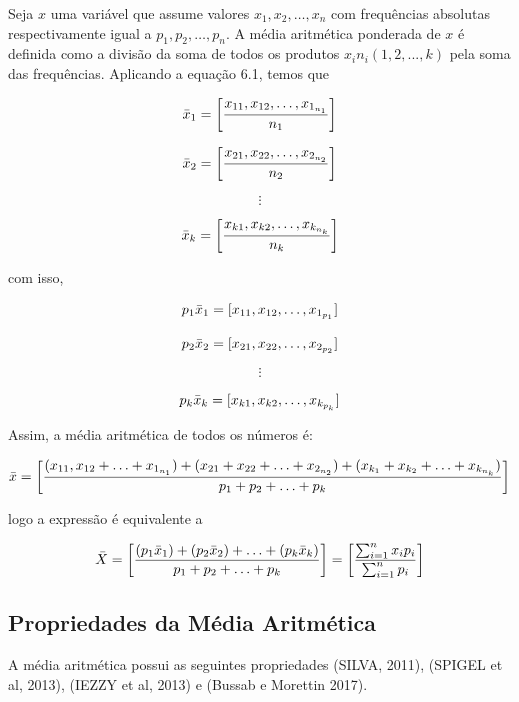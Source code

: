 Seja $x$ uma variável que assume valores $x_{1},x_{2},\ldots,x_{n}$ com frequências absolutas respectivamente igual a $p_{1},p_{2},\ldots,p_{n}$. A média aritmética ponderada de $x$ é  definida como a divisão da soma de todos os produtos $x_{i} n_{i}(1,2,...,k)$ pela soma das frequências. Aplicando a equação 6.1, temos que


$$
\Bar{x}_{1}=  \left[ \frac{x_{11},x_{12},\ldots, x_{1_{n_{1}}}}{n_{1}} \right ]
$$

$$
\Bar{x}_{2} =  \left[ \frac{x_{21},x_{22},\ldots, x_{2_{n_{2}}}}{n_{2}} \right ]
$$

$$
\vdots
$$

$$
\Bar{x}_{k} = \left[ \frac{x_{k1},x_{k2},\ldots, x_{k_{n_{k}}}}{n_{k}}  \right ]
$$

com isso, 

$$
p_{1}\Bar{x}_{1} = [x_{11},x_{12},\ldots, x_{1_{p_{1}}}]
$$

$$
p_{2}\Bar{x}_{2} = [x_{21},x_{22},\ldots, x_{2_{p_{2}}}]
$$

$$
\vdots
$$

$$
p_{k}\Bar{x}_{k} = [x_{k1},x_{k2},\ldots, x_{k_{p_{k}}}]
$$

Assim, a média aritmética de todos os números é:

$$
\Bar{x} = \left[ \frac{(x_{11},x_{12}+\ldots+x_{1_{n_{1}}})+(x_{21}+x_{22}+\ldots+x_{2_{n_{2}}})+(x_{k_{1}}+x_{k_{2}}+\ldots+x_{k_{n_{k}}})}{p_{1}+p_{2}+\ldots+p_{k}} \right ]
$$


logo a expressão é equivalente a

\begin{equation}\label{media}
    \bar{X} =  \left[ \frac{(p_{1}\Bar{x}_{1})+(p_{2}\Bar{x}_{2})+\ldots+(p_{k}\Bar{x}_{k})}{p_{1}+p_{2}+\ldots+p_{k}} \right ]  =   \left[ \frac{\sum_{i=1}^{n}x_{i}p_{i}}{\sum_{i=1}^{n}p_{i}} \right ]
\end{equation}

\subsection{Propriedades da Média Aritmética}

A média aritmética possui as seguintes propriedades (SILVA, 2011), (SPIGEL et al, 2013), (IEZZY et al, 2013) e (Bussab e Morettin 2017). 


